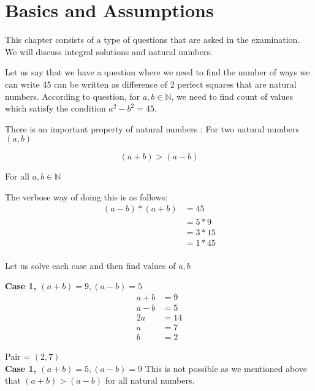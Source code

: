 \section{Basics and Assumptions}
\begin{NOTE}
    This chapter consists of a type of questions that are asked in the examination. We will discuss integral solutions and natural numbers.     
\end{NOTE}

Let us say that we have a question where we need to find the number of ways we can write 45 can be written as difference of 2 perfect squares that are natural numbers. According to question, for $a,b \in \mathbb{N}$, we need to find count of values which satisfy the condition $a^2 - b^2 = 45$. \\

\begin{NOTE}
    There is an important property of natural numbers : For two natural numbers $(a,b)$ 
    
    $$ (a + b) > (a - b) $$
    
    For all $a,b \in \mathbb{N}$
\end{NOTE}

The verbose way of doing this is as follows:
\begin{align*}
    (a-b) * (a+b) &= 45 \tag{$a^2 - b^2 = (a-b) * (a+b)$} \\
    &= 5 * 9 \tag{Case 1} \\
    &= 3 * 15 \tag{Case 2} \\
    &= 1 * 45 \tag{Case 3} \\
\end{align*}

Let us solve each case and then find values of $a,b$

\textbf{Case 1, $(a+b) = 9, (a-b) = 5$}
\begin{align*}
    a+b &= 9 \\
    a-b &= 5 \\
    2a &= 14 \tag{add above equations} \\
    a &= 7 \\
    b &= 2 \tag{Use $a+b = 9$}
\end{align*}

Pair = $(2,7)$ \\

\textbf{Case 1, $(a+b) = 5, (a-b) = 9$}
This is not possible as we mentioned above that $(a + b) > (a - b)$ for all natural numbers. \\ 

